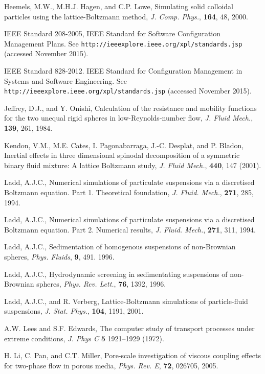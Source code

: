 \begin{thebibliography}{99}
Heemels, M.W., M.H.J. Hagen, and C.P. Lowe, Simulating solid colloidal
particles using the lattice-Boltzmann method,
\textit{J. Comp. Phys.}, \textbf{164}, 48, 2000.

IEEE Standard 208-2005, IEEE Standard for Software Configuration Management
Plans.
See \texttt{http://ieeexplore.ieee.org/xpl/standards.jsp}
(accessed November 2015).

IEEE Standard 828-2012. IEEE Standard for Configuration
Management in Systems and Software Engineering. 
See \texttt{http://ieeexplore.ieee.org/xpl/standards.jsp}
(accessed November 2015).

Jeffrey, D.J., and Y. Onishi,
Calculation of the resistance and mobility functions for the two
unequal rigid spheres in low-Reynolds-number flow,
\textit{J. Fluid Mech.}, \textbf{139}, 261, 1984.

Kendon, V.M., M.E. Cates, I. Pagonabarraga, J.-C. Desplat, and
P. Bladon,
Inertial effects in three dimensional spinodal decomposition of
a symmetric binary fluid mixture: A lattice Boltzmann study,
\textit{J. Fluid Mech.}, \textbf{440}, 147 (2001).

Ladd, A.J.C., Numerical simulations of particulate suspensions
via a discretised Boltzmann equation. Part 1. Theoretical foundation,
\textit{J. Fluid. Mech.}, \textbf{271}, 285, 1994.

Ladd, A.J.C., Numerical simulations of particulate suspensions
via a discretised Boltzmann equation. Part 2. Numerical results,
\textit{J. Fluid. Mech.}, \textbf{271}, 311, 1994.

Ladd, A.J.C., Sedimentation of homogenous suspensions of non-Brownian
spheres,
\textit{Phys. Fluids}, \textbf{9}, 491. 1996.

Ladd, A.J.C., Hydrodynamic screening in sedimentating suspensions
of non-Brownian spheres,
\textit{Phys. Rev. Lett.}, \textbf{76}, 1392, 1996.

Ladd, A.J.C., and R. Verberg,
Lattice-Boltzmann simulations of particle-fluid suspensions,
\textit{J. Stat. Phys.}, \textbf{104}, 1191, 2001.

A.W. Lees and S.F. Edwards,
The computer study of transport processes under extreme conditions,
\textit{J. Phys C} \textbf{5} 1921--1929 (1972).

H. Li, C. Pan, and C.T. Miller,
Pore-scale investigation of viscous coupling effects for two-phase
flow in porous media,
\textit{Phys. Rev. E}, \textbf{72}, 026705, 2005.


\end{thebibliography}
